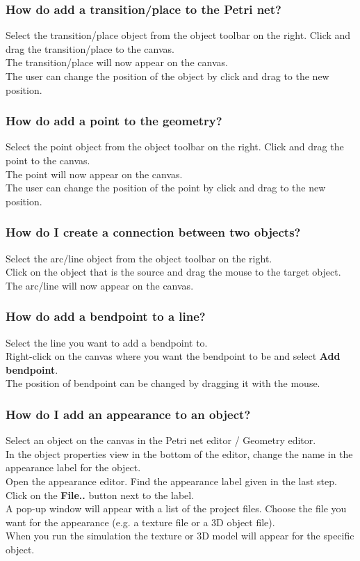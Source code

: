\documentclass[fontsize=12pt, paper=a4]{article}
\begin{document}
\subsubsection{How do add a transition/place to the Petri net?}
Select the transition/place object from the object toolbar on the right. Click and drag the transition/place to the canvas. \\
The transition/place will now appear on the canvas. \\
The user can change the position of the object by click and drag to the new position.

\subsubsection{How do add a point to the geometry?}
Select the point object from the object toolbar on the right. Click and drag the point to the canvas. \\
The point will now appear on the canvas. \\
The user can change the position of the point by click and drag to the new position.

\subsubsection{How do I create a connection between two objects?}
Select the arc/line object from the object toolbar on the right.  \\
Click on the object that is the source and drag the mouse to the target object. \\
The arc/line will now appear on the canvas. 

\subsubsection{How do add a bendpoint to a line?}
Select the line you want to add a bendpoint to. \\
Right-click on the canvas where you want the bendpoint to be and select \textbf{Add bendpoint}. \\
The position of bendpoint can be changed by dragging it with the mouse.

\subsubsection{How do I add an appearance to an object?}
Select an object on the canvas in the Petri net editor / Geometry editor. \\
In the object properties view in the bottom of the editor, change the name in the appearance label for the object. \\
Open the appearance editor. Find the appearance label given in the last step. \\
Click on the \textbf{File..} button next to the label. \\
A pop-up window will appear with a list of the project files. Choose the file you want for the appearance (e.g. a texture file or a 3D object file).\\
When you run the simulation the texture or 3D model will appear for the specific object. 
\end{document}
